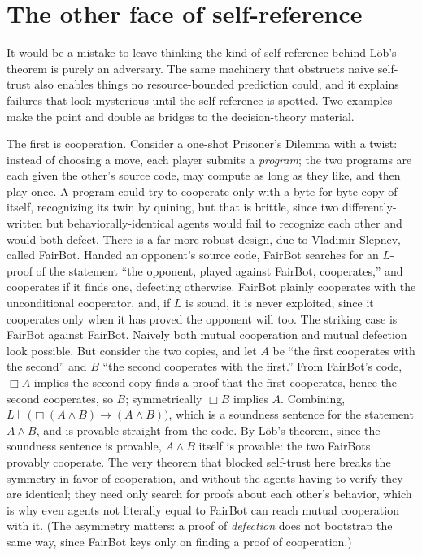 \documentclass[10pt]{article}
\theoremstyle{definition}
\theoremstyle{remark}
\newcommand{\prov}{\vdash}            %
\newcommand{\Prov}{\Box}              %
\begin{document}
\section{The other face of self-reference}
\label{sec:other-face}

It would be a mistake to leave thinking the kind of self-reference behind L\"ob's theorem is purely an adversary. The same machinery that obstructs naive self-trust also enables things no resource-bounded prediction could, and it explains failures that look mysterious until the self-reference is spotted. Two examples make the point and double as bridges to the decision-theory material.

The first is cooperation. Consider a one-shot Prisoner's Dilemma with a twist: instead of choosing a move, each player submits a \emph{program}; the two programs are each given the other's source code, may compute as long as they like, and then play once. A program could try to cooperate only with a byte-for-byte copy of itself, recognizing its twin by quining, but that is brittle, since two differently-written but behaviorally-identical agents would fail to recognize each other and would both defect. There is a far more robust design, due to Vladimir Slepnev, called FairBot. Handed an opponent's source code, FairBot searches for an $L$-proof of the statement ``the opponent, played against FairBot, cooperates,'' and cooperates if it finds one, defecting otherwise. FairBot plainly cooperates with the unconditional cooperator, and, if $L$ is sound, it is never exploited, since it cooperates only when it has proved the opponent will too. The striking case is FairBot against FairBot. Naively both mutual cooperation and mutual defection look possible. But consider the two copies, and let $A$ be ``the first cooperates with the second'' and $B$ ``the second cooperates with the first.'' From FairBot's code, $\Prov A$ implies the second copy finds a proof that the first cooperates, hence the second cooperates, so $B$; symmetrically $\Prov B$ implies $A$. Combining, $L \prov \big(\Prov(A \wedge B) \to (A \wedge B)\big)$, which is a soundness sentence for the statement $A \wedge B$, and is provable straight from the code. By L\"ob's theorem, since the soundness sentence is provable, $A \wedge B$ itself is provable: the two FairBots provably cooperate. The very theorem that blocked self-trust here breaks the symmetry in favor of cooperation, and without the agents having to verify they are identical; they need only search for proofs about each other's behavior, which is why even agents not literally equal to FairBot can reach mutual cooperation with it. (The asymmetry matters: a proof of \emph{defection} does not bootstrap the same way, since FairBot keys only on finding a proof of cooperation.)
\end{document}
